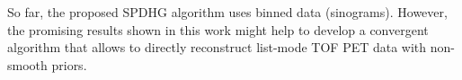 \documentclass[11pt,twocolumn,twoside]{article}
\begin{document}
So far, the proposed SPDHG algorithm uses binned data (sinograms).
However, the promising results shown in this work might help to develop a convergent
algorithm that allows to directly reconstruct list-mode TOF PET data with non-smooth
priors.

\printbibliography
\end{document}
